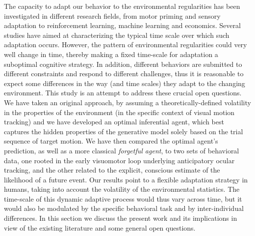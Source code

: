\documentclass[10pt,letterpaper]{article}
\newcommand{\AM}[1]{\textbf{\textcolor{blue}{[AM: #1]}}}
\begin{document}
The capacity to adapt our behavior to the environmental regularities has been investigated in different research fields, from motor priming and sensory adaptation to reinforcement learning, machine learning and economics. Several studies have aimed at characterizing the typical time scale over which such adaptation occurs. However, the pattern of environmental regularities could very well change in time, thereby making a fixed time-scale for adaptation a suboptimal cognitive strategy. In addition, different behaviors are submitted to different constraints and respond to different challenges, thus it is reasonable to expect some differences in the way (and time scales) they adapt to the changing environment. This study is an attempt to address these crucial open questions. We have taken an original approach, by assuming a theoretically-defined volatility in the properties of the environment (in the specific context of visual motion tracking) and we have developed an optimal inferential agent, which best captures the hidden properties of the generative model solely based on the trial sequence of target motion. We have then compared the optimal agent's prediction, as well as a more classical \textit{forgetful agent}, to two sets of behavioral data, one rooted in the early visuomotor loop underlying anticipatory ocular tracking, and the other related to the explicit, conscious estimate of the likelihood of a future event. Our results point to a flexible adaptation strategy in humans, taking into account the volatility of the environmental statistics. The time-scale of this dynamic adaptive process would thus vary across time, but it would also be modulated by the specific behavioral task and by inter-individual differences. In this section we discuss the present work and its implications in view of the existing literature and some general open questions.

\end{document}
